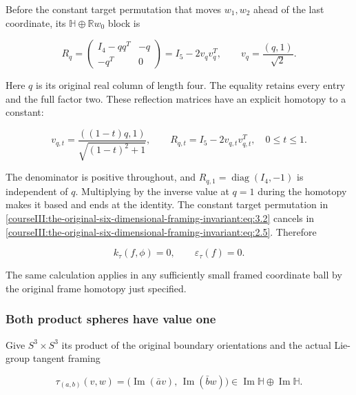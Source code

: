 Before the constant target permutation that moves \(w_1,w_2\) ahead of the last coordinate, its \(\mathbb H\oplus\mathbb R w_0\) block is

\begin{equation}
R_q=
 \begin{pmatrix}
 I_4-qq^T&-q\\-q^T&0
 \end{pmatrix}
 =I_5-2v_qv_q^T,
 \qquad
 v_q=\frac{(q,1)}{\sqrt2}.
 \label{courseIII:the-original-six-dimensional-framing-invariant:eq:3.3}
\end{equation}

Here \(q\) is its original real column of length four. The equality retains every entry and the full factor two. These reflection matrices have an explicit homotopy to a constant:

\begin{equation}
v_{q,t}=
 \frac{((1-t)q,1)}{\sqrt{(1-t)^2+1}},
 \qquad
 R_{q,t}=I_5-2v_{q,t}v_{q,t}^T,\quad0\le t\le1.
 \label{courseIII:the-original-six-dimensional-framing-invariant:eq:3.4}
\end{equation}

The denominator is positive throughout, and \(R_{q,1}=\operatorname{diag}(I_4,-1)\) is independent of \(q\). Multiplying by the inverse value at \(q=1\) during the homotopy makes it based and ends at the identity. The constant target permutation in \eqref{courseIII:the-original-six-dimensional-framing-invariant:eq:3.2} cancels in \eqref{courseIII:the-original-six-dimensional-framing-invariant:eq:2.5}. Therefore

\begin{equation}
k_\tau(f,\phi)=0,\qquad \varepsilon_\tau(f)=0.
 \label{courseIII:the-original-six-dimensional-framing-invariant:eq:3.5}
\end{equation}

The same calculation applies in any sufficiently small framed coordinate ball by the original frame homotopy just specified.

\subsubsection{Both product spheres have value one}
\label{courseIII:the-original-six-dimensional-framing-invariant:section-3.2}

Give \(S^3\times S^3\) its product of the original boundary orientations and the actual Lie-group tangent framing

\begin{equation}
\tau_{(a,b)}(v,w)=
       \bigl(\operatorname{Im}(\bar av),\,
             \operatorname{Im}(\bar bw)\bigr)
       \in\operatorname{Im}\mathbb H\oplus\operatorname{Im}\mathbb H.
 \label{courseIII:the-original-six-dimensional-framing-invariant:eq:3.6}
\end{equation}

